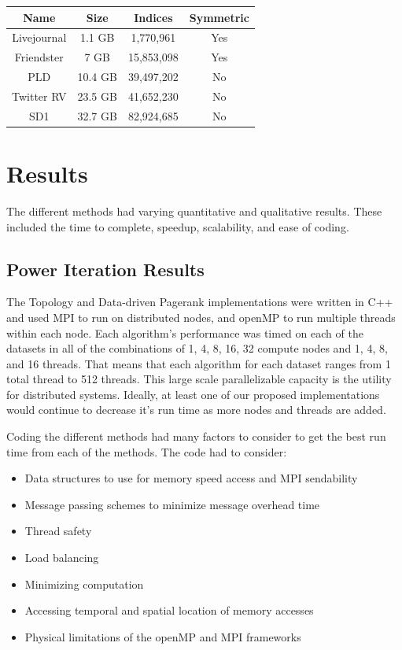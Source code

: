 \documentclass[letterpaper,11pt,onecolumn]{article}
\begin{document}
\begin{center}
  \begin{tabular}{ c | c  | c | c }
    \hline
    Name & Size & Indices & Symmetric \\ \hline \hline
    Livejournal & 1.1 GB & 1,770,961 & Yes \\ \hline
    Friendster & 7 GB & 15,853,098 & Yes \\ \hline
    PLD & 10.4 GB & 39,497,202 & No \\ \hline
    Twitter RV & 23.5 GB & 41,652,230 & No \\ \hline
    SD1 & 32.7 GB & 82,924,685 & No \\
    \hline
  \end{tabular}
  \label{table:data}
\end{center}



\section{Results}
The different methods had varying quantitative and qualitative results. These included the time to complete, speedup, scalability, and ease of coding. 

\subsection{Power Iteration Results}

The Topology and Data-driven Pagerank implementations were written in C++ and used MPI to run on distributed nodes, and openMP to run multiple threads within each node. Each algorithm’s performance was timed on each of the datasets in all of the combinations of 1, 4, 8, 16, 32 compute nodes and 1, 4, 8, and 16 threads. That means that each algorithm for each dataset ranges from 1 total thread to 512 threads. This large scale parallelizable capacity is the utility for distributed systems. Ideally, at least one of our proposed implementations would continue to decrease it's run time as more nodes and threads are added.

Coding the different methods had many factors to consider to get the best run time from each of the methods. The code had to consider:

\begin{itemize}
\item Data structures to use for memory speed access and MPI sendability
\item Message passing schemes to minimize message overhead time
\item Thread safety
\item Load balancing
\item Minimizing computation
\item Accessing temporal and spatial location of memory accesses
\item Physical limitations of the openMP and MPI frameworks
\end{itemize}
\end{document}
